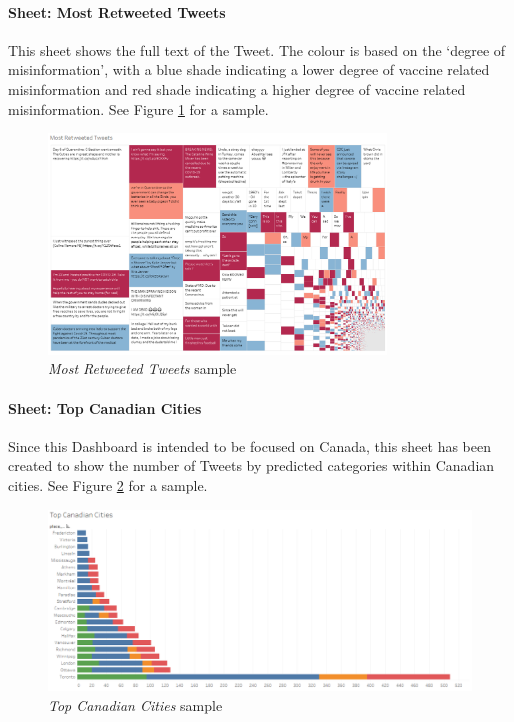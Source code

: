 \documentclass[12pt]{article}
\begin{document}
\paragraph{Sheet: Most Retweeted Tweets}
This sheet shows the full text of the Tweet. The colour is based on the ‘degree of misinformation’, with a blue shade indicating a lower degree of vaccine related misinformation and red shade indicating a higher degree of vaccine related misinformation. See Figure \ref{fig:most_rt} for a sample.

\begin{figure}[tbp]
\centering 
\includegraphics[width=0.8\textwidth]{figures/most_rt}
\caption{\textit{Most Retweeted Tweets} sample} 
\label{fig:most_rt}
\end{figure}

\paragraph{Sheet: Top Canadian Cities}
Since this Dashboard is intended to be focused on Canada, this sheet has been created to show the number of Tweets by predicted categories within Canadian cities. See Figure \ref{fig:topcan} for a sample.

\begin{figure}[tbp]
\centering 
\includegraphics[width=1\textwidth]{figures/topcan}
\caption{\textit{Top Canadian Cities} sample} 
\label{fig:topcan}
\end{figure}
\end{document}
